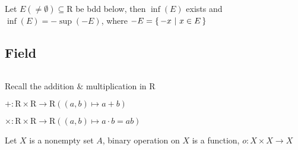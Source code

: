 \begin{rmk*}
	Let $E(\neq \emptyset) \subseteq \mathrm{R}$ be bdd below, then $\inf (E)$ exists and $\inf(E) = -\sup(-E)$, where $-E = \left\{ \,-x ~|~x \in E \,\right\}$
\end{rmk*}

\subsection{Field} $ $
 
Recall the addition $\&$ multiplication in $\mathrm{R}$

$+ : \mathrm{R} \times \mathrm{R} \rightarrow \mathrm{R}((a,b)\mapsto a+b)$

$\times : \mathrm{R} \times \mathrm{R} \rightarrow \mathrm{R}((a,b)\mapsto a \cdot b = ab)$

\begin{defn}
	Let $X$ is a nonempty set $A$, binary operation on $X$ is a function, $o:X\times X \rightarrow X$
\end{defn}


